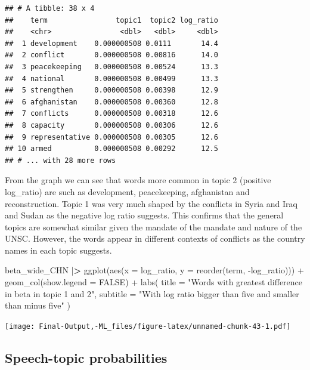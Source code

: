 \documentclass[
]{article}
\newenvironment{Shaded}{\begin{snugshade}}{\end{snugshade}}
\newcommand{\AttributeTok}[1]{\textcolor[rgb]{0.77,0.63,0.00}{#1}}
\newcommand{\ConstantTok}[1]{\textcolor[rgb]{0.00,0.00,0.00}{#1}}
\newcommand{\ErrorTok}[1]{\textcolor[rgb]{0.64,0.00,0.00}{\textbf{#1}}}
\newcommand{\FunctionTok}[1]{\textcolor[rgb]{0.00,0.00,0.00}{#1}}
\newcommand{\NormalTok}[1]{#1}
\newcommand{\SpecialCharTok}[1]{\textcolor[rgb]{0.00,0.00,0.00}{#1}}
\newcommand{\StringTok}[1]{\textcolor[rgb]{0.31,0.60,0.02}{#1}}
\begin{document}
\begin{verbatim}
## # A tibble: 38 x 4
##    term                topic1  topic2 log_ratio
##    <chr>                <dbl>   <dbl>     <dbl>
##  1 development    0.000000508 0.0111       14.4
##  2 conflict       0.000000508 0.00816      14.0
##  3 peacekeeping   0.000000508 0.00524      13.3
##  4 national       0.000000508 0.00499      13.3
##  5 strengthen     0.000000508 0.00398      12.9
##  6 afghanistan    0.000000508 0.00360      12.8
##  7 conflicts      0.000000508 0.00318      12.6
##  8 capacity       0.000000508 0.00306      12.6
##  9 representative 0.000000508 0.00305      12.6
## 10 armed          0.000000508 0.00292      12.5
## # ... with 28 more rows
\end{verbatim}

From the graph we can see that words more common in topic 2 (positive
log\_ratio) are such as development, peacekeeping, afghanistan and
reconstruction. Topic 1 was very much shaped by the conflicts in Syria
and Iraq and Sudan as the negative log ratio suggests. This confirms
that the general topics are somewhat similar given the mandate of the
mandate and nature of the UNSC. However, the words appear in different
contexts of conflicts as the country names in each topic suggests.

\begin{Shaded}
\begin{Highlighting}[]
\NormalTok{beta\_wide\_CHN }\SpecialCharTok{|}\ErrorTok{\textgreater{}} 
\FunctionTok{ggplot}\NormalTok{(}\FunctionTok{aes}\NormalTok{(}\AttributeTok{x =}\NormalTok{ log\_ratio, }\AttributeTok{y =} \FunctionTok{reorder}\NormalTok{(term, }\SpecialCharTok{{-}}\NormalTok{log\_ratio))) }\SpecialCharTok{+}
  \FunctionTok{geom\_col}\NormalTok{(}\AttributeTok{show.legend =} \ConstantTok{FALSE}\NormalTok{) }\SpecialCharTok{+}
    \FunctionTok{labs}\NormalTok{(}
        \AttributeTok{title =} \StringTok{"Words with greatest difference in beta in topic 1 and 2"}\NormalTok{,}
        \AttributeTok{subtitle =} \StringTok{"With log ratio bigger than five and smaller than minus five"}
\NormalTok{    )}
\end{Highlighting}
\end{Shaded}

\texttt{[image: Final-Output,-ML\_files/figure-latex/unnamed-chunk-43-1.pdf]}

\hypertarget{speech-topic-probabilities}{%
\subsection{Speech-topic
probabilities}\label{speech-topic-probabilities}}
\end{document}
